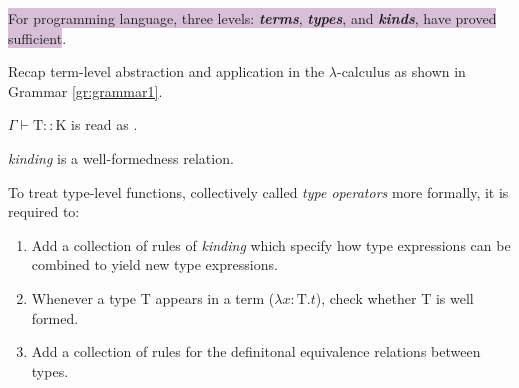 \colorbox{thistle}{For programming language, three levels: \textit{\textbf{terms}}, \textit{\textbf{types}}, and \textit{\textbf{kinds}}, have proved sufficient}.

Recap term-level abstraction and application in the $\lambda$-calculus as shown in Grammar \ref{gr:grammar1}.

$\Gamma \vdash \text{T}::\text{K}$ is read as .



\textit{kinding} is a well-formedness relation.

\begin{question}{To treat type-level functions, collectively called \textit{type operators} more formally, it is required to:}
\begin{enumerate}
    \setlength\itemsep{-.3em}
    \item Add a collection of rules of \textit{kinding} which specify how type expressions can be combined to yield new type expressions.
    \item Whenever a type T appears in a term ($\lambda x:\text{T}.t$), check whether T is well formed.
    \item Add a collection of rules for the definitonal equivalence relations between types.
\end{enumerate}
\end{question}

\begin{grammar}
\end{grammar}